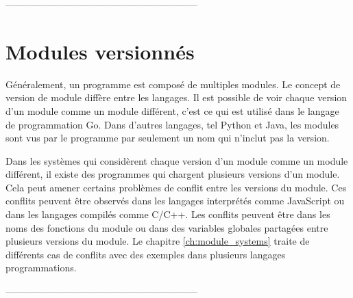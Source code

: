 ------------------------------------------------------------

\section{Modules versionnés}
%
Généralement, un programme est composé de multiples modules.
Le concept de version de
module diffère entre les langages. Il est possible de voir chaque version d'un
module comme un module différent, c'est ce qui est utilisé dans le langage de programmation Go. Dans d'autres langages,
tel Python et Java, les modules sont vus par le programme par seulement
un nom qui n'inclut pas la version.

Dans les systèmes qui considèrent chaque version d'un module comme un module différent,
il existe des programmes qui chargent plusieurs versions d'un module. Cela peut amener
certains problèmes de conflit entre les versions du module. Ces conflits peuvent être
observés dans les langages interprétés comme JavaScript ou dans les langages compilés
comme C/C++. Les conflits peuvent être dans les noms des fonctions du module ou
dans des variables globales partagées entre plusieurs versions du module. Le chapitre
\ref{ch:module_systems} traite de différents cas de conflits avec des exemples
dans plusieurs langages programmations.


------------------------------------------------------------






